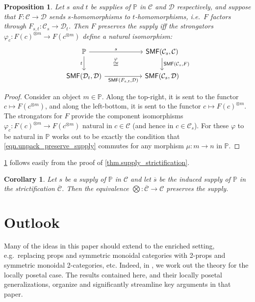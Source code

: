 \documentclass[11pt, oneside, article]{memoir}
\theoremstyle{plain}
\newtheorem{proposition}[theorem]{Proposition}
\newtheorem{corollary}[theorem]{Corollary}
\theoremstyle{definition}
\theoremstyle{remark}
\newcommand{\cat}[1]{\mathcal{#1}}%
\newcommand{\Cat}[1]{{\mathsf{#1}}}%
\newcommand{\tpow}[1]{^{\otimes #1}}
\newcommand{\strict}[1]{\overline{#1}}
\newcommand{\smf}{\Cat{SMF}}
\newcommand{\pp}{\mathbb{P}}
\begin{document}
\begin{proposition}\label{prop.easy_pres_supply}
Let $s$ and $t$ be supplies of $\pp$ in $\cat{C}$ and $\cat{D}$ respectively, and suppose that $F\colon\cat{C}\to\cat{D}$ sends $s$-homomorphisms to $t$-homomorphisms, i.e.\ $F$ factors through $F_{s,t}\colon\cat{C}_s\to\cat{D}_t$. Then $F$ preserves the supply iff the strongators $\varphi_c\colon F(c)\tpow{m}\to F(c\tpow{m})$ define a natural isomorphism:
\begin{equation}\label{eqn.pres_supply}
\begin{tikzcd}[column sep=55pt]
	\pp\ar[r, "s"]\ar[d, "t"']&
	\smf(\cat{C}_s,\cat{C})\ar[d, "{\smf(\cat{C}_s,F)}"]\\
	\smf(\cat{D}_t,\cat{D})\ar[r, "{\smf(F_{s,t},\cat{D})}"']&
	\smf(\cat{C}_s,\cat{D})\ar[ul, phantom, "\overset{\varphi}{\cong}"]
\end{tikzcd}
\end{equation}
\end{proposition}
\begin{proof}
Consider an object $m\in\pp$. Along the top-right, it is sent to the functor $c\mapsto F(c\tpow{m})$, and along the left-bottom, it is sent to the functor $c\mapsto F(c)\tpow{m}$. The strongators for $F$ provide the component isomorphisms $\varphi_c\colon F(c)\tpow{m}\to F(c\tpow{m})$ natural in $c\in\cat{C}$ (and hence in $c\in\cat{C}_s$). For these $\varphi$ to be natural in $\pp$ works out to be exactly the condition that  \cref{eqn.unpack_preserve_supply} commutes for any morphism $\mu\colon m\to n$ in $\pp$.
\end{proof}

\cref{cor.strict_equiv_pres_supply} follows easily from the proof of \cref{thm.supply_strictification}.

\begin{corollary}\label{cor.strict_equiv_pres_supply}
Let $s$ be a supply of $\pp$ in $\cat{C}$ and let $\strict{s}$ be the induced supply of $\pp$ in the strictification $\strict{\cat{C}}$. Then the equivalence $\bigotimes\colon\strict{\cat{C}}\to\cat{C}$ preserves the supply.
\end{corollary}

\chapter{Outlook}

Many of the ideas in this paper should extend to the enriched setting, e.g.\ replacing props and symmetric monoidal categories with 2-props and symmetric monoidal 2-categories, etc. Indeed, in \cite{fong2019abelian}, we work out the theory for the locally posetal case. The results contained here, and their locally posetal generalizations, organize and significantly streamline key arguments in that paper.
\end{document}
